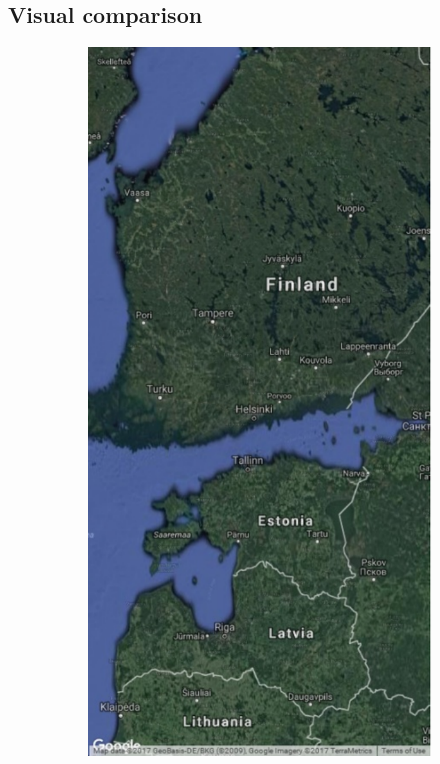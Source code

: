 \documentclass[a4paper,12pt]{scrbook}
\begin{document}
\subsection{Visual comparison}

\begin{figure}
  \centering
  \begin{subfigure}[t]{.24\textwidth}
    \includegraphics[width=\textwidth]{thesis-figures/figures-qgis/fulltile-google}

\end{subfigure}
\end{figure}
\end{document}
